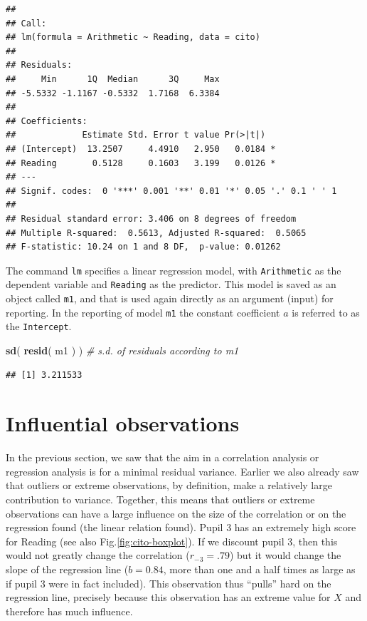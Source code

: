\documentclass[
]{book}
\newenvironment{Shaded}{\begin{snugshade}}{\end{snugshade}}
\newcommand{\CommentTok}[1]{\textcolor[rgb]{0.56,0.35,0.01}{\textit{#1}}}
\newcommand{\FunctionTok}[1]{\textcolor[rgb]{0.13,0.29,0.53}{\textbf{#1}}}
\newcommand{\NormalTok}[1]{#1}
\begin{document}
\begin{verbatim}
## 
## Call:
## lm(formula = Arithmetic ~ Reading, data = cito)
## 
## Residuals:
##     Min      1Q  Median      3Q     Max 
## -5.5332 -1.1167 -0.5332  1.7168  6.3384 
## 
## Coefficients:
##             Estimate Std. Error t value Pr(>|t|)  
## (Intercept)  13.2507     4.4910   2.950   0.0184 *
## Reading       0.5128     0.1603   3.199   0.0126 *
## ---
## Signif. codes:  0 '***' 0.001 '**' 0.01 '*' 0.05 '.' 0.1 ' ' 1
## 
## Residual standard error: 3.406 on 8 degrees of freedom
## Multiple R-squared:  0.5613, Adjusted R-squared:  0.5065 
## F-statistic: 10.24 on 1 and 8 DF,  p-value: 0.01262
\end{verbatim}

The command \texttt{lm} specifies a linear regression model, with \texttt{Arithmetic}
as the dependent variable and \texttt{Reading} as the predictor. This model is
saved as an object called \texttt{m1}, and that is used again directly as an argument
(input) for reporting. In the reporting of model \texttt{m1} the constant coefficient
\(a\) is referred to as the \texttt{Intercept}.

\begin{Shaded}
\begin{Highlighting}[]
\FunctionTok{sd}\NormalTok{( }\FunctionTok{resid}\NormalTok{( m1 ) ) }\CommentTok{\# s.d. of residuals according to \textasciigrave{}m1\textasciigrave{}}
\end{Highlighting}
\end{Shaded}

\begin{verbatim}
## [1] 3.211533
\end{verbatim}

\section{Influential observations}\label{influential-observations}

In the previous section, we saw that the aim in a correlation analysis
or regression analysis is for a minimal residual variance.
Earlier we also already saw that outliers or extreme observations, by definition,
make a relatively large contribution to variance. Together, this means that
outliers or extreme observations can have a large influence on the size of
the correlation or on the regression found (the linear relation found). Pupil 3 has an
extremely high score for Reading (see also
Fig.\ref{fig:cito-boxplot}). If we discount pupil 3, then this would not greatly
change the correlation (\(r_{-3}=.79\)) but it would change the slope of the regression line
(\(b=0.84\), more than one and a half times as large as if pupil 3 were in fact included).
This observation thus ``pulls'' hard on the regression line, precisely because
this observation has an extreme value for \(X\) and therefore has much influence.
\end{document}
